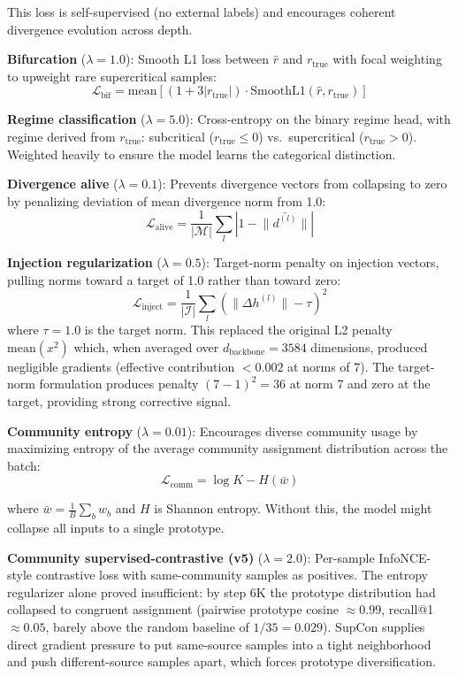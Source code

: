 \documentclass[
  11pt]{article}
\begin{document}
This loss is self-supervised (no external labels) and encourages
coherent divergence evolution across depth.

\textbf{Bifurcation} (\(\lambda = 1.0\)): Smooth L1 loss between
\(\hat{r}\) and \(r_{\text{true}}\) with focal weighting to upweight
rare supercritical samples:
\[\mathcal{L}_{\text{bif}} = \text{mean}[(1 + 3|r_{\text{true}}|) \cdot \text{SmoothL1}(\hat{r}, r_{\text{true}})]\]

\textbf{Regime classification} (\(\lambda = 5.0\)): Cross-entropy on the
binary regime head, with regime derived from \(r_{\text{true}}\):
subcritical (\(r_{\text{true}} \leq 0\)) vs.~supercritical
(\(r_{\text{true}} > 0\)). Weighted heavily to ensure the model learns
the categorical distinction.

\textbf{Divergence alive} (\(\lambda = 0.1\)): Prevents divergence
vectors from collapsing to zero by penalizing deviation of mean
divergence norm from 1.0:
\[\mathcal{L}_{\text{alive}} = \frac{1}{|\mathcal{M}|} \sum_l \left|1 - \bar{\|d^{(l)}\|}\right|\]

\textbf{Injection regularization} (\(\lambda = 0.5\)): Target-norm
penalty on injection vectors, pulling norms toward a target of 1.0
rather than toward zero:
\[\mathcal{L}_{\text{inject}} = \frac{1}{|\mathcal{I}|} \sum_l \left(\|\Delta h^{(l)}\| - \tau\right)^2\]
where \(\tau = 1.0\) is the target norm. This replaced the original L2
penalty \(\text{mean}(x^2)\) which, when averaged over
\(d_{\text{backbone}} = 3584\) dimensions, produced negligible gradients
(effective contribution \(< 0.002\) at norms of 7). The target-norm
formulation produces penalty \((7-1)^2 = 36\) at norm 7 and zero at the
target, providing strong corrective signal.

\textbf{Community entropy} (\(\lambda = 0.01\)): Encourages diverse
community usage by maximizing entropy of the average community
assignment distribution across the batch:
\[\mathcal{L}_{\text{comm}} = \log K - H(\bar{w})\]

where \(\bar{w} = \frac{1}{B}\sum_b w_b\) and \(H\) is Shannon entropy.
Without this, the model might collapse all inputs to a single prototype.

\textbf{Community supervised-contrastive (v5)} (\(\lambda = 2.0\)):
Per-sample InfoNCE-style contrastive loss with same-community samples as
positives. The entropy regularizer alone proved insufficient: by step 6K
the prototype distribution had collapsed to congruent assignment
(pairwise prototype cosine \(\approx 0.99\), recall@1 \(\approx 0.05\),
barely above the random baseline of \(1/35 = 0.029\)). SupCon supplies
direct gradient pressure to put same-source samples into a tight
neighborhood and push different-source samples apart, which forces
prototype diversification.
\end{document}
